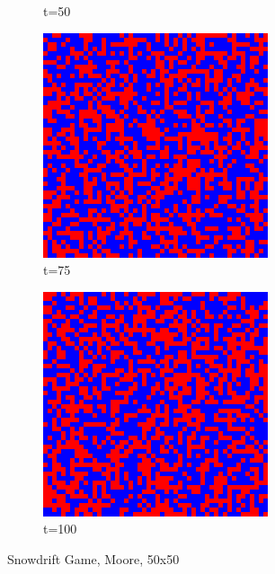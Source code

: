 \documentclass[a4paper, 11pt]{article}
\begin{document}
\begin{figure}[H]
\begin{subfigure}{.25\textwidth}
  \caption{t=50}
\end{subfigure}%
\begin{subfigure}{.25\textwidth}
  \centering
  \includegraphics[width=0.9\linewidth]{SNOWDRIFT_MOORE_50x50_t75}
  \caption{t=75}
\end{subfigure}%
\begin{subfigure}{.25\textwidth}
  \centering
  \includegraphics[width=0.9\linewidth]{SNOWDRIFT_MOORE_50x50_t100}
  \caption{t=100}
\end{subfigure}
\caption{Snowdrift Game, Moore, 50x50}
\end{figure}
\end{document}
